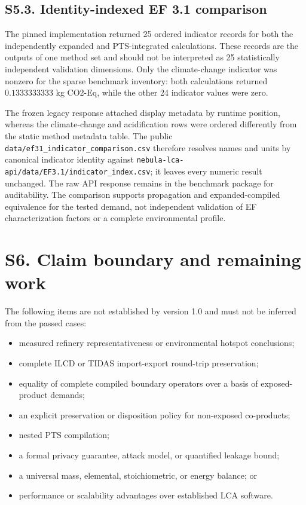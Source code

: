 \documentclass[
  10pt,
  a4paper,
  DIV=11,
  numbers=noendperiod]{scrartcl}
\providecommand{\tightlist}{%
  \setlength{\itemsep}{0pt}\setlength{\parskip}{0pt}}
\begin{document}
\subsection{S5.3. Identity-indexed EF 3.1
comparison}\label{s5.3.-identity-indexed-ef-3.1-comparison}

The pinned implementation returned 25 ordered indicator records for both
the independently expanded and PTS-integrated calculations. These
records are the outputs of one method set and should not be interpreted
as 25 statistically independent validation dimensions. Only the
climate-change indicator was nonzero for the sparse benchmark inventory:
both calculations returned \(0.1333333333\) kg CO2-Eq, while the other
24 indicator values were zero.

The frozen legacy response attached display metadata by runtime
position, whereas the climate-change and acidification rows were ordered
differently from the static method metadata table. The public
\texttt{data/ef31\_indicator\_comparison.csv} therefore resolves names
and units by canonical indicator identity against
\texttt{nebula-lca-api/data/EF3.1/indicator\_index.csv}; it leaves every
numeric result unchanged. The raw API response remains in the benchmark
package for auditability. The comparison supports propagation and
expanded-compiled equivalence for the tested demand, not independent
validation of EF characterization factors or a complete environmental
profile.

\section{S6. Claim boundary and remaining
work}\label{s6.-claim-boundary-and-remaining-work}

The following items are not established by version 1.0 and must not be
inferred from the passed cases:

\begin{itemize}
\tightlist
\item
  measured refinery representativeness or environmental hotspot
  conclusions;
\item
  complete ILCD or TIDAS import-export round-trip preservation;
\item
  equality of complete compiled boundary operators over a basis of
  exposed-product demands;
\item
  an explicit preservation or disposition policy for non-exposed
  co-products;
\item
  nested PTS compilation;
\item
  a formal privacy guarantee, attack model, or quantified leakage bound;
\item
  a universal mass, elemental, stoichiometric, or energy balance; or
\item
  performance or scalability advantages over established LCA software.
\end{itemize}
\end{document}

